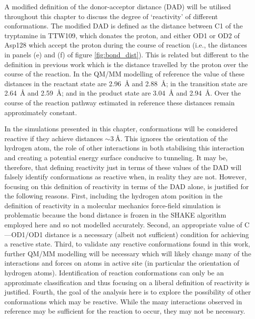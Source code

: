 A modified definition of the donor-acceptor distance (DAD) will be utilised throughout this chapter to discuss the degree of `reactivity' of different conformations. The modified DAD is defined as the distance between C1 of the tryptamine in TTW109, which  donates the proton,  and either OD1 or OD2 of Asp128 which accept the proton during the course of reaction (i.e., the distances in panels (e) and (f) of figure \ref{fig:bond_dist}). This is related but different to the definition in previous work \cite{johannissenProtonTunnelingAromatic2007} which is the distance travelled by the proton over the course of the reaction.  In the QM/MM modelling of reference \cite{ranaghanInitioQMMM2017} the value of these distances in the reactant state are \SI{2.96}{\angstrom} and \SI{2.88}{\angstrom}; in the transition state are \SI{2.64}{\angstrom} and \SI{2.59}{\angstrom}; and in the product state are \SI{3.04}{\angstrom} and \SI{2.94}{\angstrom}. Over the course of the reaction pathway estimated in reference \cite{ranaghanInitioQMMM2017} these distances remain approximately constant. 

In the simulations presented in this chapter, conformations will be considered reactive if they achieve distances $\sim \SI{3}{\angstrom}$. This ignores the orientation of the hydrogen atom, the role of other interactions in both stabilising this interaction and creating a potential energy surface conducive to tunneling. It may be, therefore, that defining reactivity just in terms of these values of the DAD will falsely identify conformations as reactive when, in reality they are not.  However, focusing on this definition of reactivity in terms of the DAD alone, is justified for the following reasons. First, including the hydrogen atom position in the definition of reactivity in a molecular mechanics force-field simulation is problematic because the bond distance is frozen in the SHAKE algorithm employed here and so not modelled accurately. Second, an appropriate value of C---OD1/OD1 distance is a necessary (albeit not sufficient) condition for achieving a reactive state. Third, to validate any reactive conformations found in this work, further QM/MM modelling will be necessary which will likely change many of the interactions and forces on atoms in active site (in particular the orientation of hydrogen atoms). Identification of reaction conformations can only be an approximate classification and thus focusing on a liberal definition of reactivity is justified.  Fourth, the goal of the analysis here is to explore the possibility of other conformations which may be reactive. While the many interactions observed in reference \cite{ranaghanInitioQMMM2017} may be sufficient for the reaction to occur, they may not be necessary.


